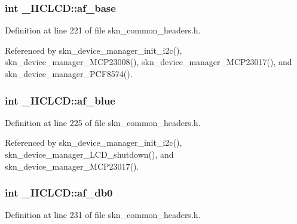 \subsubsection[{\texorpdfstring{af\+\_\+base}{af_base}}]{\setlength{\rightskip}{0pt plus 5cm}int \+\_\+\+I\+I\+C\+L\+C\+D\+::af\+\_\+base}\hypertarget{struct___i_i_c_l_c_d_ae74954b1b96523d617a68e42c2663086}{}\label{struct___i_i_c_l_c_d_ae74954b1b96523d617a68e42c2663086}


Definition at line 221 of file skn\+\_\+common\+\_\+headers.\+h.



Referenced by skn\+\_\+device\+\_\+manager\+\_\+init\+\_\+i2c(), skn\+\_\+device\+\_\+manager\+\_\+\+M\+C\+P23008(), skn\+\_\+device\+\_\+manager\+\_\+\+M\+C\+P23017(), and skn\+\_\+device\+\_\+manager\+\_\+\+P\+C\+F8574().

\subsubsection[{\texorpdfstring{af\+\_\+blue}{af_blue}}]{\setlength{\rightskip}{0pt plus 5cm}int \+\_\+\+I\+I\+C\+L\+C\+D\+::af\+\_\+blue}\hypertarget{struct___i_i_c_l_c_d_ad64bc4c5fc6a592f161e594f0b2433e1}{}\label{struct___i_i_c_l_c_d_ad64bc4c5fc6a592f161e594f0b2433e1}


Definition at line 225 of file skn\+\_\+common\+\_\+headers.\+h.



Referenced by skn\+\_\+device\+\_\+manager\+\_\+init\+\_\+i2c(), skn\+\_\+device\+\_\+manager\+\_\+\+L\+C\+D\+\_\+shutdown(), and skn\+\_\+device\+\_\+manager\+\_\+\+M\+C\+P23017().

\subsubsection[{\texorpdfstring{af\+\_\+db0}{af_db0}}]{\setlength{\rightskip}{0pt plus 5cm}int \+\_\+\+I\+I\+C\+L\+C\+D\+::af\+\_\+db0}\hypertarget{struct___i_i_c_l_c_d_a86dfd51ffdc849569bc91bba9f9cd4a6}{}\label{struct___i_i_c_l_c_d_a86dfd51ffdc849569bc91bba9f9cd4a6}


Definition at line 231 of file skn\+\_\+common\+\_\+headers.\+h.



